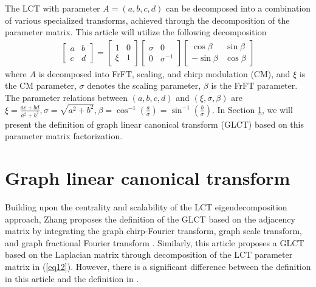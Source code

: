 \documentclass[lettersize,journal]{IEEEtran}
\begin{document}
The LCT with parameter $A=(a,b,c,d)$ can be decomposed into a combination of various specialized transforms, achieved through the decomposition of the parameter matrix. This article will utilize the following decomposition
\begin{align} \label{eq12}
	\left[\begin{array}{ll}
		a & b \\
		c & d
	\end{array}\right]=\left[\begin{array}{ll}
		1 & 0 \\
		\xi & 1
	\end{array}\right]\left[\begin{array}{cc}
		\sigma & 0 \\
		0 & \sigma^{-1}
	\end{array}\right]\left[\begin{array}{cc}
		\cos \beta & \sin \beta \\
		-\sin \beta & \cos \beta
	\end{array}\right]
\end{align}
where $A$ is decomposed into FrFT, scaling, and chirp modulation (CM), and $\xi$ is the CM parameter, $\sigma$ denotes the scaling parameter, $\beta$ is the FrFT parameter. The parameter relations between $(a,b,c,d)$ and $(\xi,\sigma,\beta)$ are
$\xi=\frac{a c+b d}{a^2+b^2}, \sigma=\sqrt{a^2+b^2}, \beta=\cos ^{-1}\left(\frac{a}{\sigma}\right)=\sin ^{-1}\left(\frac{b}{\sigma}\right)$.
In Section \ref{sec3}, we will present the definition of graph linear canonical transform (GLCT) based on this parameter matrix factorization.


\section{Graph linear canonical transform} \label{sec3}
Building upon the centrality and scalability of the LCT eigendecomposition approach, Zhang proposes the definition of the GLCT based on the adjacency matrix by integrating the graph chirp-Fourier transform, graph scale transform, and graph fractional Fourier transform \cite{zhang2023discrete}. Similarly, this article proposes a GLCT based on the Laplacian matrix through decomposition of the LCT parameter matrix in (\ref{eq12}). However, there is a significant difference between the definition in this article and the definition in \cite{zhang2023discrete}.
\end{document}
